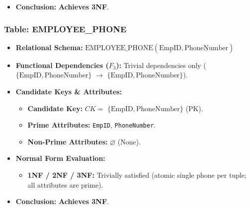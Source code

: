 \documentclass[a4paper,12pt]{report}
\providecommand{\tightlist}{%
  \setlength{\itemsep}{0pt}\setlength{\parskip}{0pt}}
\begin{document}
\begin{itemize}
  \begin{itemize}
  \item
    \textbf{1NF:} Satisfied (composite \texttt{FullName} and \texttt{Address} attributes decomposed into atomic columns \texttt{FirstName}, \texttt{MiddleName}, \texttt{LastName}, \texttt{Street}, \texttt{Ward}, \texttt{District}, \texttt{City}; multivalued attributes extracted to separate tables).
  \item
    \textbf{2NF:} Satisfied (all candidate keys are single attributes; no partial dependencies).
  \item
    \textbf{3NF:} Satisfied (every determinant is a superkey; no transitive dependencies among non-prime attributes).
  \end{itemize}
\item
  \textbf{Conclusion:} \textbf{Achieves 3NF}.
\end{itemize}

\subsubsection{\texorpdfstring{Table: EMPLOYEE\_\allowbreak{}PHONE}{Table: EMPLOYEEPHONE}}\label{table-employee_phone}

\begin{itemize}
\item
  \textbf{Relational Schema:} \(\text{EMPLOYEE\_PHONE}(\underline{\text{EmpID}}, \underline{\text{PhoneNumber}})\)
\item
  \textbf{Functional Dependencies (\(F_{3}\)):} Trivial dependencies only (\(\{\text{EmpID}, \text{PhoneNumber}\}\) \(\rightarrow\) \(\{\text{EmpID}, \text{PhoneNumber}\}\)).
\item
  \textbf{Candidate Keys \& Attributes:}

  \begin{itemize}
  \item
    \textbf{Candidate Key:} \(CK =\) \(\{\text{EmpID}, \text{PhoneNumber}\}\) (PK).
  \item
    \textbf{Prime Attributes:} \texttt{EmpID}, \texttt{PhoneNumber}.
  \item
    \textbf{Non-Prime Attributes:} \(\varnothing\) (None).
  \end{itemize}
\item
  \textbf{Normal Form Evaluation:}

  \begin{itemize}
  \tightlist
  \item
    \textbf{1NF / 2NF / 3NF:} Trivially satisfied (atomic single phone per tuple; all attributes are prime).
  \end{itemize}
\item
  \textbf{Conclusion:} \textbf{Achieves 3NF}.
\end{itemize}
\end{document}
